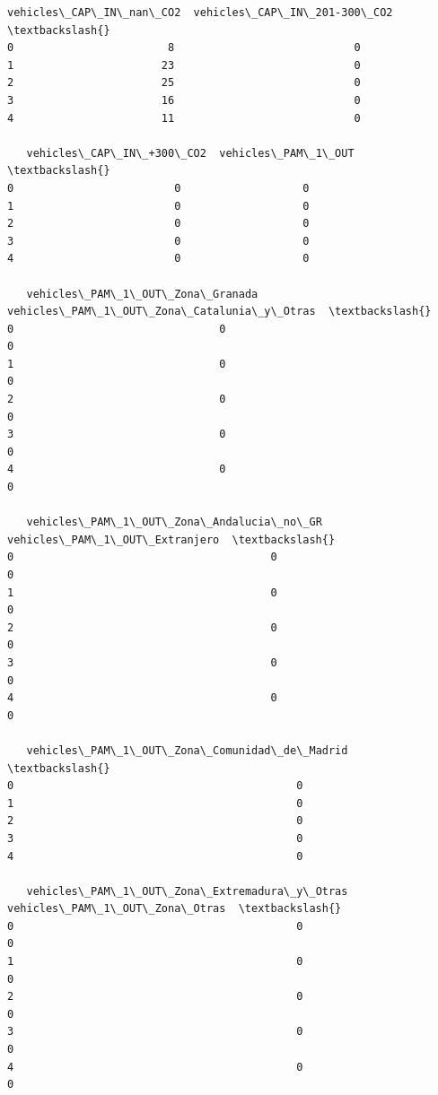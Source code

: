 \documentclass[11pt]{article}
\begin{document}
\begin{tcolorbox}[breakable, size=fbox, boxrule=.5pt, pad at break*=1mm, opacityfill=0]
\begin{Verbatim}[commandchars=\\\{\}]
   vehicles\_CAP\_IN\_nan\_CO2  vehicles\_CAP\_IN\_201-300\_CO2  \textbackslash{}
0                        8                            0
1                       23                            0
2                       25                            0
3                       16                            0
4                       11                            0

   vehicles\_CAP\_IN\_+300\_CO2  vehicles\_PAM\_1\_OUT  \textbackslash{}
0                         0                   0
1                         0                   0
2                         0                   0
3                         0                   0
4                         0                   0

   vehicles\_PAM\_1\_OUT\_Zona\_Granada  vehicles\_PAM\_1\_OUT\_Zona\_Catalunia\_y\_Otras  \textbackslash{}
0                                0                                          0
1                                0                                          0
2                                0                                          0
3                                0                                          0
4                                0                                          0

   vehicles\_PAM\_1\_OUT\_Zona\_Andalucia\_no\_GR  vehicles\_PAM\_1\_OUT\_Extranjero  \textbackslash{}
0                                        0                              0
1                                        0                              0
2                                        0                              0
3                                        0                              0
4                                        0                              0

   vehicles\_PAM\_1\_OUT\_Zona\_Comunidad\_de\_Madrid  \textbackslash{}
0                                            0
1                                            0
2                                            0
3                                            0
4                                            0

   vehicles\_PAM\_1\_OUT\_Zona\_Extremadura\_y\_Otras  vehicles\_PAM\_1\_OUT\_Zona\_Otras  \textbackslash{}
0                                            0                              0
1                                            0                              0
2                                            0                              0
3                                            0                              0
4                                            0                              0


\end{Verbatim}
\end{tcolorbox}
\end{document}
